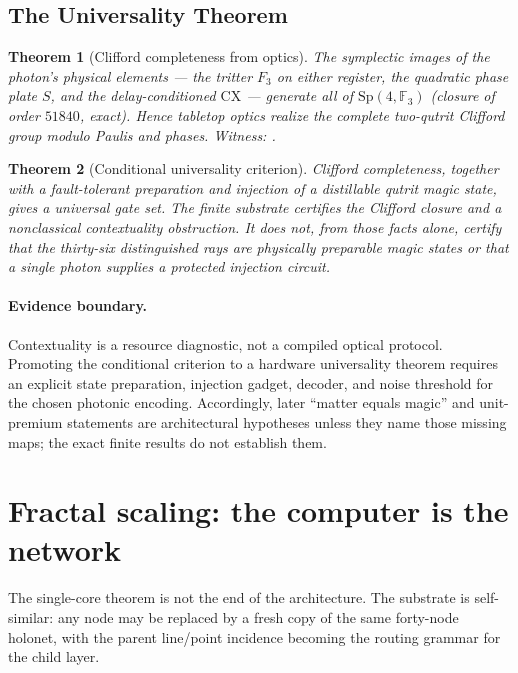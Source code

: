 \documentclass[11pt]{article}
\newtheorem{theorem}{Theorem}[section]
\newcommand{\GF}[1]{\mathbb{F}_{#1}}
\newcommand{\Sp}{\mathrm{Sp}}
\begin{document}
\subsection{The Universality Theorem}
\label{sec:universality}

\begin{theorem}[Clifford completeness from optics]
The symplectic images of the photon's physical elements --- the tritter
$F_3$ on either register, the quadratic phase plate $S$, and the
delay-conditioned $\mathrm{CX}$ --- generate all of $\Sp(4,\GF3)$
(closure of order $51840$, exact).  Hence tabletop optics realize the
complete two-qutrit Clifford group modulo Paulis and phases.
\emph{Witness: .}
\end{theorem}

\begin{theorem}[Conditional universality criterion]
Clifford completeness, together with a fault-tolerant preparation and
injection of a distillable qutrit magic state, gives a universal gate set.
The finite substrate certifies the Clifford closure and a nonclassical
contextuality obstruction.  It does not, from those facts alone, certify that
the thirty-six distinguished rays are physically preparable magic states or
that a single photon supplies a protected injection circuit.
\end{theorem}

\paragraph{Evidence boundary.}
Contextuality is a resource diagnostic, not a compiled optical protocol.
Promoting the conditional criterion to a hardware universality theorem
requires an explicit state preparation, injection gadget, decoder, and noise
threshold for the chosen photonic encoding.  Accordingly, later ``matter
equals magic'' and unit-premium statements are architectural hypotheses unless
they name those missing maps; the exact finite results do not establish them.

\section{Fractal scaling: the computer is the network}
\label{sec:fractal}

The single-core theorem is not the end of the architecture.  The
substrate is self-similar: any node may be replaced by a fresh copy of
the same forty-node holonet, with the parent line/point incidence
becoming the routing grammar for the child layer.
\end{document}
